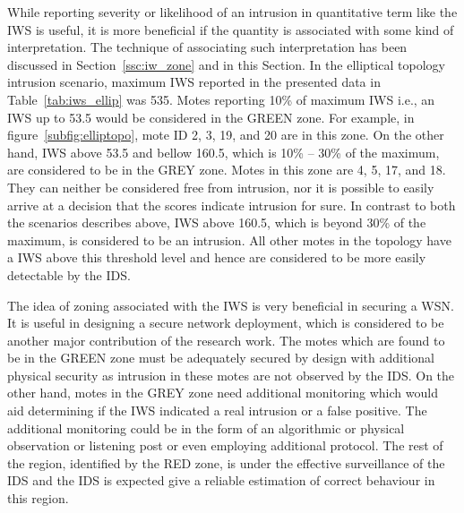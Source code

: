 \documentclass[conference,manuscript]{IEEEtran}
\newcommand{\notedme}[1]{\raisebox{0pt}[0pt][0pt]{\pdfcomment[open=true,color=blue]{#1}}}
\begin{document}
While reporting severity or likelihood of an intrusion in quantitative term like the IWS is useful, it is more beneficial if the quantity is associated with some kind of interpretation.
The technique of associating such interpretation has been discussed in Section~\ref{ssc:iw_zone} and in this Section. 
In the elliptical topology intrusion scenario, maximum IWS reported in the presented data in Table~\ref{tab:iws_ellip} was 535. 
Motes reporting 10\% of maximum IWS i.e., an IWS up to 53.5 would be considered in the GREEN zone.
For example, in figure~\ref{subfig:elliptopo}, mote ID 2, 3, 19, and 20 are in this zone.
On the other hand, IWS above 53.5 and bellow 160.5, which is 10\% -- 30\% of the maximum, are considered to be in the GREY zone. 
Motes in this zone are 4, 5, 17, and 18.
They can neither be considered free from intrusion, nor it is possible to easily arrive at a decision that the scores indicate intrusion for sure.
In contrast to both the scenarios describes above, IWS above 160.5, which is beyond 30\% of the maximum, is considered to be an intrusion.
All other motes in the topology have a IWS above this threshold level and hence are considered to be more easily detectable by the IDS. %

The idea of zoning associated with the IWS is very beneficial in securing a WSN.
It is useful in designing a secure network deployment, which is considered to be another major contribution of the research work.
The motes which are found to be in the GREEN zone must be adequately secured by design with additional physical security as intrusion in these motes are not observed by the IDS.
On the other hand, motes in the GREY zone need additional monitoring which would aid determining if the IWS indicated a real intrusion or a false positive.
The additional monitoring could be in the form of an algorithmic or physical observation or listening post or even employing additional protocol.
The rest of the region, identified by the RED zone, is under the effective surveillance of the IDS and the IDS is expected give a reliable estimation of correct behaviour in this region.
\end{document}
